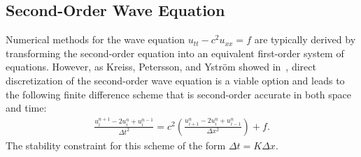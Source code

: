 \documentclass[fleqn,12pt,twoside]{article}
\newcommand{\bea}{\begin{eqnarray}}
\newcommand{\eea}{\end{eqnarray}}
\def\dt{\Delta t}
\def\dx{\Delta x}
\begin{document}
\subsection{Second-Order Wave Equation\label{sec:wave_eqn_1d}}
Numerical methods for the wave equation $u_{tt} - c^2 u_{xx} = f$ are typically 
derived by transforming the second-order equation into an equivalent
first-order system of equations.  However, as Kreiss, Petersson, and Ystr\"om 
showed in~\cite{kreiss2002}, direct discretization of the second-order wave 
equation is a viable option and leads to the following finite difference 
scheme that is second-order accurate in both space and time:
\bea
  \frac{u^{n+1}_i - 2 u^n_i + u^{n-1}_i}{\dt^2}
  = c^2 \left( \frac{u^{n}_{i+1} - 2 u^n_i + u^n_{i-1}}{\dx^2} \right)
  + f.
  \label{eq:wave_eqn_KPY}
\eea
The stability constraint for this scheme of the form $\dt = K \dx$.
\end{document}
